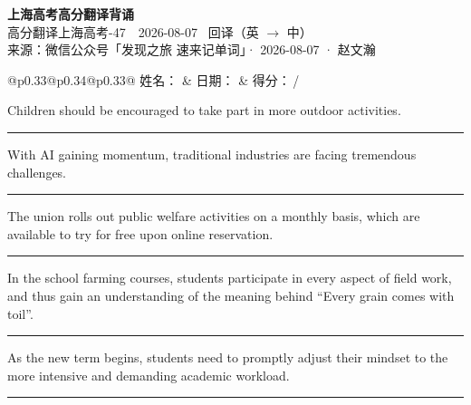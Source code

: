 \documentclass[11pt,a4paper]{article}
\newcommand{\num}[1]{\makebox[1.9em][r]{#1.}\hspace{0.3em}}
\newcommand{\wline}{\noindent\rule{\linewidth}{0.4pt}}
\begin{document}
\pagestyle{plain}
\begin{center}
{\LARGE\bfseries 上海高考高分翻译背诵 }\\[0.25em]
{\large 高分翻译上海高考-47　2026-08-07 \quad\ 回译（英 $\to$ 中）}\\[0.35em]
{\footnotesize 来源：微信公众号「发现之旅 速来记单词」· 2026-08-07 · 赵文瀚}
\end{center}

\vspace{0.4em}
\noindent\begin{tabular}{@{}p{0.33\textwidth}@{}p{0.34\textwidth}@{}p{0.33\textwidth}@{}}
姓名：\underline{\hspace{2.0cm}} & 日期：\underline{\hspace{2.0cm}} & 得分：\underline{\hspace{1.4cm}}\,/ \\
\end{tabular}

\vspace{0.5em}

\vspace{0.8em}
\num{1}Children should be encouraged to take part in more outdoor activities.

\vspace{0.25em}

\wline

\num{2}With AI gaining momentum, traditional industries are facing tremendous challenges.

\vspace{0.25em}

\wline

\num{3}The union rolls out public welfare activities on a monthly basis, which are available to try for free upon online reservation.

\vspace{0.25em}

\wline

\num{4}In the school farming courses, students participate in every aspect of field work, and thus gain an understanding of the meaning behind “Every grain comes with toil”.

\vspace{0.25em}

\wline

\num{5}As the new term begins, students need to promptly adjust their mindset to the more intensive and demanding academic workload.

\vspace{0.25em}

\wline
\end{document}
